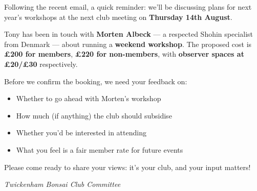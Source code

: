 Following the recent email, a quick reminder: we'll be discussing plans for next year's workshops at the next club meeting on \textbf{Thursday 14th August}.

Tony has been in touch with \textbf{Morten Albeck} --- a respected Shohin specialist from Denmark --- about running a \textbf{weekend workshop}. The proposed cost is \textbf{£200 for members}, \textbf{£220 for non-members}, with \textbf{observer spaces at £20/£30} respectively.

Before we confirm the booking, we need your feedback on:
\begin{itemize}
  \item Whether to go ahead with Morten's workshop
  
  \item How much (if anything) the club should subsidise
  
  \item Whether you'd be interested in attending
  
  \item What you feel is a fair member rate for future events
\end{itemize}

Please come ready to share your views: it's your club, and your input matters!

\hfill
\textit{Twickenham Bonsai Club Committee}
\closearticle
\columnbreak
